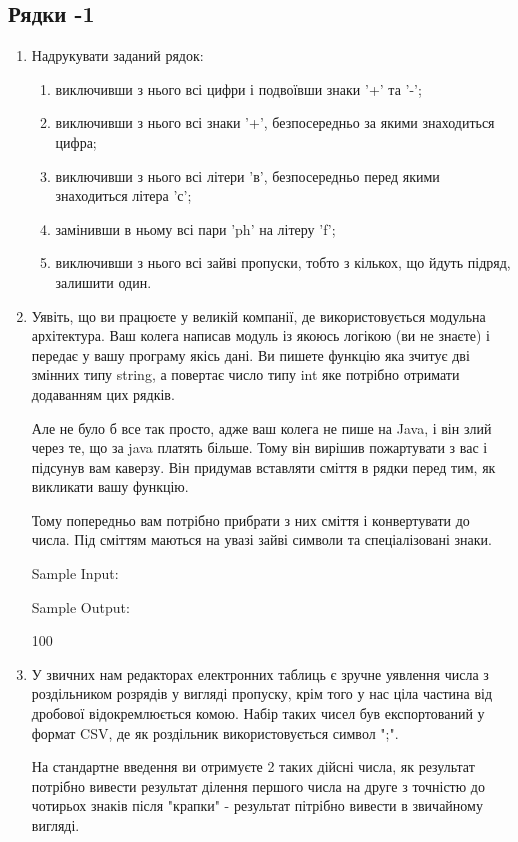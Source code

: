 \documentclass[]{article}
\makeatletter
\newcommand{\xslalph}[1]{\expandafter\@xslalph\csname c@#1\endcsname}
\newcommand{\@xslalph}[1]{%
    \ifcase#1\or а\or б\or в\or г\or д\or e\or є\or ж\or з\or i%
    \or й\or к\or л\or м\or н\or о\or п\or р\or с\or т%
    \or у\or ф\or х\or ц\or ч\or ш\or ю\or я\or аа\or бб\or вв %
    \else\@ctrerr\fi%
}
\makeatother
\begin{document}
\subsection{Рядки -1}
\begin{enumerate}
\def\labelenumi{\arabic{enumi}.}

\item  Надрукувати заданий рядок:
\begin{enumerate}[label=\xslalph*)]
\item виключивши з нього всі цифри і подвоївши знаки '+' та '-';
\item виключивши з нього всі знаки '+', безпосередньо за якими знаходиться цифра;
\item виключивши з нього всі літери 'в', безпосередньо перед якими знаходиться літера 'с';
\item замінивши в ньому всі пари 'ph' на літеру 'f';
\item виключивши з нього всі зайві пропуски, тобто з кількох, що йдуть підряд, залишити один.
\end{enumerate}

\item
Уявіть, що ви працюєте у великій компанії, де використовується модульна архітектура. Ваш колега написав модуль із якоюсь логікою (ви не знаєте) і передає у вашу програму якісь дані. Ви пишете функцію яка зчитує дві змінних типу string, а повертає число типу int яке потрібно отримати додаванням цих рядків.

Але не було б все так просто, адже ваш колега не пише на Java, і він злий через те, що за java платять більше. Тому він вирішив пожартувати з вас і підсунув вам каверзу. Він придумав вставляти сміття в рядки перед тим, як викликати вашу функцію.

Тому попередньо вам потрібно прибрати з них сміття і конвертувати до числа. Під сміттям маються на увазі зайві символи та спеціалізовані знаки. 

Sample Input:


Sample Output:

100 

\item
У звичних нам редакторах електронних таблиць є зручне уявлення числа з роздільником розрядів у вигляді пропуску, крім того у нас ціла частина від дробової відокремлюється комою. Набір таких чисел був експортований у формат CSV, де як роздільник використовується символ ";".

На стандартне введення ви отримуєте 2 таких дійсні числа, як результат потрібно вивести результат ділення першого числа на друге з точністю до чотирьох знаків після "крапки" - результат пітрібно вивести в звичайному вигляді. 


\end{enumerate}
\end{document}
